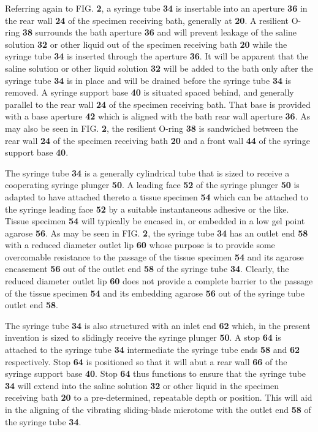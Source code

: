 \documentclass{article}
\begin{document}
Referring again to FIG. \textbf{2}, a syringe tube \textbf{34} is insertable into an aperture \textbf{36} in the rear wall \textbf{24} of the specimen receiving bath, generally at \textbf{20}. A resilient O-ring \textbf{38} surrounds the bath aperture \textbf{36} and will prevent leakage of the saline solution \textbf{32} or other liquid out of the specimen receiving bath \textbf{20} while the syringe tube \textbf{34} is inserted through the aperture \textbf{36}. It will be apparent that the saline solution or other liquid solution \textbf{32} will be added to the bath only after the syringe tube \textbf{34} is in place and will be drained before the syringe tube \textbf{34} is removed. A syringe support base \textbf{40} is situated spaced behind, and generally parallel to the rear wall \textbf{24} of the specimen receiving bath. That base is provided with a base aperture \textbf{42} which is aligned with the bath rear wall aperture \textbf{36}. As may also be seen in FIG. \textbf{2}, the resilient O-ring \textbf{38} is sandwiched between the rear wall \textbf{24} of the specimen receiving bath \textbf{20} and a front wall \textbf{44} of the syringe support base \textbf{40}.

The syringe tube \textbf{34} is a generally cylindrical tube that is sized to receive a cooperating syringe plunger \textbf{50}. A leading face \textbf{52} of the syringe plunger \textbf{50} is adapted to have attached thereto a tissue specimen \textbf{54} which can be attached to the syringe leading face \textbf{52} by a suitable instantaneous adhesive or the like. Tissue specimen \textbf{54} will typically be encased in, or embedded in a low gel point agarose \textbf{56}. As may be seen in FIG. \textbf{2}, the syringe tube \textbf{34} has an outlet end \textbf{58} with a reduced diameter outlet lip \textbf{60} whose purpose is to provide some overcomable resistance to the passage of the tissue specimen \textbf{54} and its agarose encasement \textbf{56} out of the outlet end \textbf{58} of the syringe tube \textbf{34}. Clearly, the reduced diameter outlet lip \textbf{60} does not provide a complete barrier to the passage of the tissue specimen \textbf{54} and its embedding agarose \textbf{56} out of the syringe tube outlet end \textbf{58}.

The syringe tube \textbf{34} is also structured with an inlet end \textbf{62} which, in the present invention is sized to slidingly receive the syringe plunger \textbf{50}. A stop \textbf{64} is attached to the syringe tube \textbf{34} intermediate the syringe tube ends \textbf{58} and \textbf{62} respectively. Stop \textbf{64} is positioned so that it will abut a rear wall \textbf{66} of the syringe support base \textbf{40}. Stop \textbf{64} thus functions to ensure that the syringe tube \textbf{34} will extend into the saline solution \textbf{32} or other liquid in the specimen receiving bath \textbf{20} to a pre-determined, repeatable depth or position. This will aid in the aligning of the vibrating sliding-blade microtome with the outlet end \textbf{58} of the syringe tube \textbf{34}.
\end{document}
